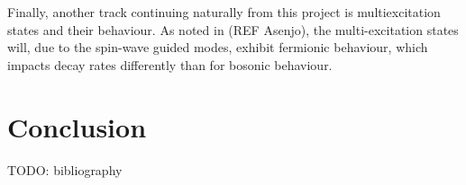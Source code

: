 \documentclass{article}
\begin{document}
Finally, another track continuing naturally from this project is multiexcitation states and their behaviour. As noted in (REF Asenjo), the multi-excitation states will, due to the spin-wave guided modes, exhibit fermionic behaviour, which impacts decay rates differently than for bosonic behaviour. 

\section{Conclusion}

\newpage
TODO: bibliography
\end{document}
